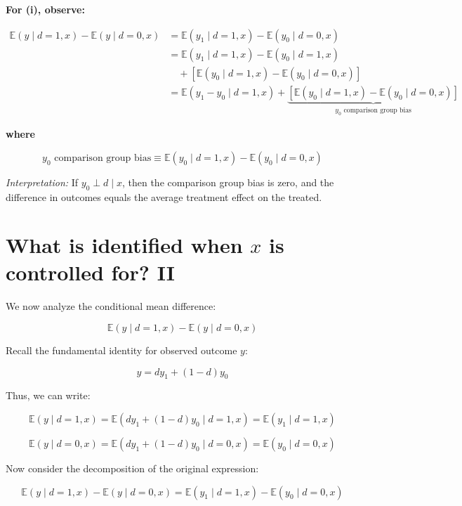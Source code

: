 \documentclass[12pt]{article}
\begin{document}
\textbf{For (i), observe:}

\begin{align*}
\mathbb{E}(y \mid d = 1, x) - \mathbb{E}(y \mid d = 0, x)
&= \mathbb{E}(y_1 \mid d = 1, x) - \mathbb{E}(y_0 \mid d = 0, x) \\
&= \mathbb{E}(y_1 \mid d = 1, x) - \mathbb{E}(y_0 \mid d = 1, x) \\
&\quad + \left[ \mathbb{E}(y_0 \mid d = 1, x) - \mathbb{E}(y_0 \mid d = 0, x) \right] \\
&= \mathbb{E}(y_1 - y_0 \mid d = 1, x) + \underbrace{\left[ \mathbb{E}(y_0 \mid d = 1, x) - \mathbb{E}(y_0 \mid d = 0, x) \right]}_{\text{$y_0$ comparison group bias}}
\end{align*}

\vspace{0.5em}

\textbf{where}

\[
\text{$y_0$ comparison group bias} \equiv \mathbb{E}(y_0 \mid d = 1, x) - \mathbb{E}(y_0 \mid d = 0, x)
\]

\textit{Interpretation:} If $y_0 \perp d \mid x$, then the comparison group bias is zero, and the difference in outcomes equals the average treatment effect on the treated.

\section*{What is identified when $x$ is controlled for? II}

We now analyze the conditional mean difference:

\[
\mathbb{E}(y \mid d = 1, x) - \mathbb{E}(y \mid d = 0, x)
\]

Recall the fundamental identity for observed outcome \( y \):

\[
y = d y_1 + (1 - d) y_0
\]

Thus, we can write:

\[
\mathbb{E}(y \mid d = 1, x) = \mathbb{E}(d y_1 + (1 - d) y_0 \mid d = 1, x) = \mathbb{E}(y_1 \mid d = 1, x)
\]

\[
\mathbb{E}(y \mid d = 0, x) = \mathbb{E}(d y_1 + (1 - d) y_0 \mid d = 0, x) = \mathbb{E}(y_0 \mid d = 0, x)
\]

Now consider the decomposition of the original expression:

\[
\mathbb{E}(y \mid d = 1, x) - \mathbb{E}(y \mid d = 0, x)
= \mathbb{E}(y_1 \mid d = 1, x) - \mathbb{E}(y_0 \mid d = 0, x)
\]
\end{document}
